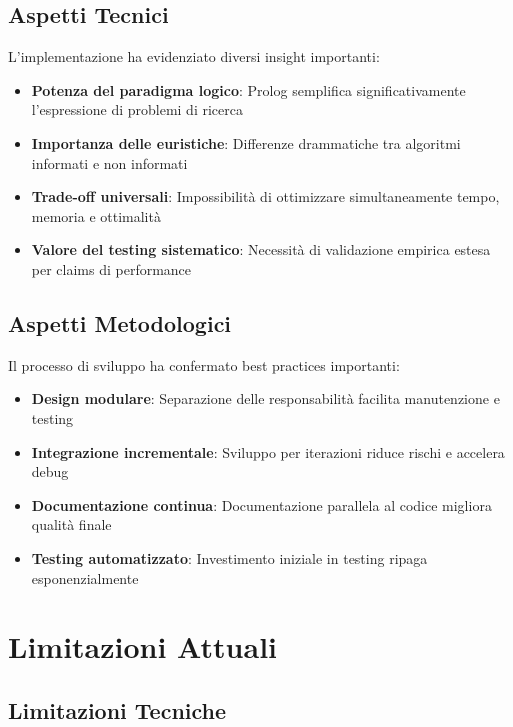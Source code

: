 \documentclass[12pt,a4paper]{report}
\theoremstyle{definition}
\begin{document}
\subsection{Aspetti Tecnici}

L'implementazione ha evidenziato diversi insight importanti:

\begin{itemize}
    \item \textbf{Potenza del paradigma logico}: Prolog semplifica significativamente l'espressione di problemi di ricerca
    \item \textbf{Importanza delle euristiche}: Differenze drammatiche tra algoritmi informati e non informati
    \item \textbf{Trade-off universali}: Impossibilità di ottimizzare simultaneamente tempo, memoria e ottimalità
    \item \textbf{Valore del testing sistematico}: Necessità di validazione empirica estesa per claims di performance
\end{itemize}

\subsection{Aspetti Metodologici}

Il processo di sviluppo ha confermato best practices importanti:

\begin{itemize}
    \item \textbf{Design modulare}: Separazione delle responsabilità facilita manutenzione e testing
    \item \textbf{Integrazione incrementale}: Sviluppo per iterazioni riduce rischi e accelera debug
    \item \textbf{Documentazione continua}: Documentazione parallela al codice migliora qualità finale
    \item \textbf{Testing automatizzato}: Investimento iniziale in testing ripaga esponenzialmente
\end{itemize}

\section{Limitazioni Attuali}

\subsection{Limitazioni Tecniche}
\end{document}
